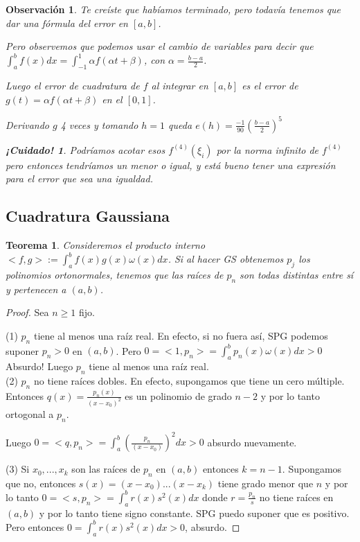 \documentclass[10pt,a4paper,final]{report}
\newtheorem{theorem}{Teorema}
\newtheorem{observation}{Observación}
\newtheorem{caution}{¡Cuidado!}
\begin{document}
{\begin{observation}
Te creíste que habíamos terminado, pero todavía tenemos que dar una fórmula del error en $[a,b]$.

Pero observemos que podemos usar el cambio de variables para decir que $\int_a^b f(x) dx = \int_{-1}^1 \alpha f(\alpha t + \beta)$, con $\alpha = \frac{b-a}{2}$.

Luego el error de cuadratura de $f$ al integrar en $[a,b]$ es el error de $g(t)=\alpha f(\alpha t + \beta)$ en el $[0,1]$.

Derivando $g$ 4 veces y tomando $h=1$ queda $e(h) = \frac{-1}{90} (\frac{b-a}{2})^5$

\begin{caution}
	Podríamos acotar esos $f^(4)(\xi_i)$ por la norma infinito de $f^(4)$ pero entonces tendríamos un menor o igual, y está bueno tener una expresión para el error que sea una igualdad.
\end{caution}

\end{observation}


\subsection{Cuadratura Gaussiana}

\begin{theorem}
Consideremos el producto interno $<f,g>:= \int_a^b f(x) g(x) \omega(x) dx$. Si al hacer GS obtenemos ${p_j}$ los polinomios ortonormales, tenemos que las raíces de $p_n$ son todas distintas entre sí y pertenecen a $(a,b)$.
\end{theorem}

\begin{proof}
	Sea $n\geq 1$ fijo.
	
	(1) $p_n$ tiene al menos una raíz real. En efecto, si no fuera así, SPG podemos suponer $p_n >0$ en $(a,b)$. Pero $0=<1,p_n> = \int_a^b p_n(x) \omega(x) dx > 0$ Absurdo! Luego $p_n$ tiene al menos una raíz real.\\
	
	(2) $p_n$ no tiene raíces dobles. En efecto, supongamos que tiene un cero múltiple. Entonces $q(x) = \frac{p_n(x)}{(x-x_0)^2}$ es un polinomio de grado $n-2$ y por lo tanto ortogonal a $p_n$.
	
	Luego $0=<q,p_n> = \int_a^b (\frac{p_n}{(x-x_0)})^2 dx > 0$ absurdo nuevamente.
	
	(3) Si $x_0,...,x_k$ son las raíces de $p_n$ en $(a,b)$ entonces $k=n-1$. Supongamos que no, entonces $s(x) = (x-x_0)...(x-x_k)$ tiene grado menor que $n$ y por lo tanto $0=<s,p_n> = \int_a^b r(x) s^2(x) dx$ donde $r = \frac{p_n}{s}$ no tiene raíces en $(a,b)$ y por lo tanto tiene signo constante. SPG puedo suponer que es positivo. Pero entonces $0 = \int_a^b r(x) s^2(x) dx > 0$, absurdo.
	

\end{proof}}
\end{document}
